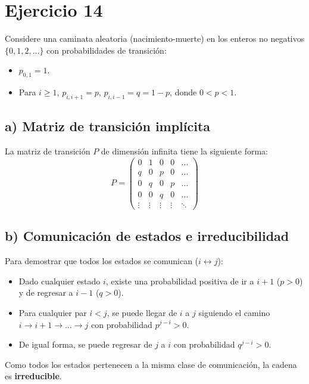 \documentclass[letterpaper, 12pt]{article}
\begin{document}
    \newpage

    \section*{Ejercicio 14}

    Considere una caminata aleatoria (nacimiento-muerte) en los enteros no negativos $\{0, 1, 2, \dots\}$ con probabilidades de transición:
    \begin{itemize}
        \item $p_{0,1} = 1$.
        \item Para $i \geq 1$, $p_{i,i+1} = p$, $p_{i,i-1} = q = 1 - p$, donde $0 < p < 1$.
    \end{itemize}

    \subsection*{a) Matriz de transición implícita}
    La matriz de transición $P$ de dimensión infinita tiene la siguiente forma:
    \[
    P = \begin{pmatrix} 
    0 & 1 & 0 & 0 & \dots \\ 
    q & 0 & p & 0 & \dots \\ 
    0 & q & 0 & p & \dots \\ 
    0 & 0 & q & 0 & \dots \\ 
    \vdots & \vdots & \vdots & \vdots & \ddots 
    \end{pmatrix}
    \]

    \subsection*{b) Comunicación de estados e irreducibilidad}
    Para demostrar que todos los estados se comunican ($i \leftrightarrow j$):
    \begin{itemize}
        \item Dado cualquier estado $i$, existe una probabilidad positiva de ir a $i+1$ ($p > 0$) y de regresar a $i-1$ ($q > 0$).
        \item Para cualquier par $i < j$, se puede llegar de $i$ a $j$ siguiendo el camino $i \to i+1 \to \dots \to j$ con probabilidad $p^{j-i} > 0$.
        \item De igual forma, se puede regresar de $j$ a $i$ con probabilidad $q^{j-i} > 0$.
    \end{itemize}
    Como todos los estados pertenecen a la misma clase de comunicación, la cadena es \textbf{irreducible}.
\end{document}
